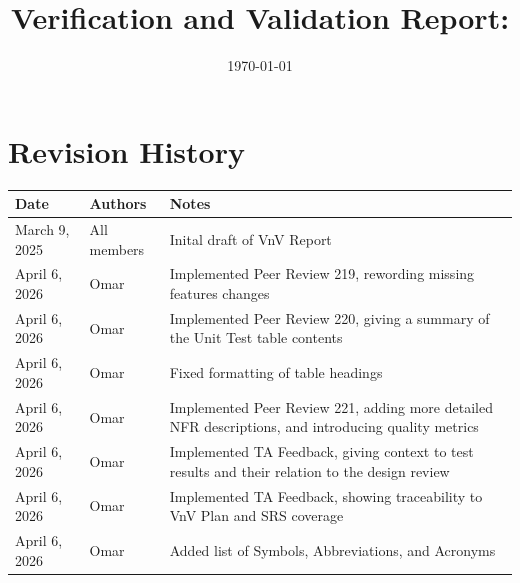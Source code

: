 \documentclass[12pt, titlepage]{article}
\begin{document}
\title{Verification and Validation Report: \progname}
\author{\authname}
\date{\today}

\maketitle


\section{Revision History}

\begin{tabularx}{\textwidth}{p{3cm}p{2cm}X}
\toprule {\bf Date} & {\bf Authors} & {\bf Notes}\\
\midrule
March 9, 2025 & All members & Inital draft of VnV Report \\
April 6, 2026 & Omar & Implemented Peer Review 219, rewording missing features changes \\
April 6, 2026 & Omar & Implemented Peer Review 220, giving a summary of the Unit Test table contents \\
April 6, 2026 & Omar & Fixed formatting of table headings \\
April 6, 2026 & Omar & Implemented Peer Review 221, adding more detailed NFR descriptions, and introducing quality metrics \\
April 6, 2026 & Omar & Implemented TA Feedback, giving context to test results and their relation to the design review \\
April 6, 2026 & Omar & Implemented TA Feedback, showing traceability to VnV Plan and SRS coverage \\
April 6, 2026 & Omar & Added list of Symbols, Abbreviations, and Acronyms \\
\bottomrule
\end{tabularx}

\newpage

\tableofcontents

\listoftables %

\end{document}

